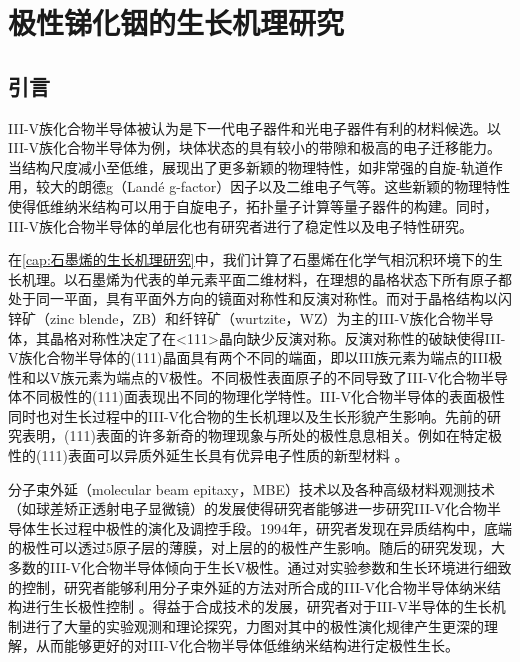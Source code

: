 \chapter{极性锑化铟的生长机理研究}
\section{引言}
    III-V族化合物半导体被认为是下一代电子器件和光电子器件有利的材料候选。以III-V族化合物半导体为例，块体状态的具有较小的带隙和极高的电子迁移能力。当结构尺度减小至低维，展现出了更多新颖的物理特性，如非常强的自旋-轨道作用，较大的朗德g（Landé g-factor）因子以及二维电子气等。这些新颖的物理特性使得低维纳米结构可以用于自旋电子，拓扑量子计算等量子器件的构建。同时，III-V族化合物半导体的单层化也有研究者进行了稳定性以及电子特性研究。

    在\ref{cap:石墨烯的生长机理研究}中，我们计算了石墨烯在化学气相沉积环境下的生长机理。以石墨烯为代表的单元素平面二维材料，在理想的晶格状态下所有原子都处于同一平面，具有平面外方向的镜面对称性和反演对称性。而对于晶格结构以闪锌矿（zinc blende，ZB）和纤锌矿（wurtzite，WZ）为主的III-V族化合物半导体，其晶格对称性决定了在<111>晶向缺少反演对称。反演对称性的破缺使得III-V族化合物半导体的(111)晶面具有两个不同的端面，即以III族元素为端点的III极性和以V族元素为端点的V极性。不同极性表面原子的不同导致了III-V化合物半导体不同极性的(111)面表现出不同的物理化学特性。III-V化合物半导体的表面极性同时也对生长过程中的III-V化合物的生长机理以及生长形貌产生影响。先前的研究表明，(111)表面的许多新奇的物理现象与所处的极性息息相关。例如在特定极性的(111)表面可以异质外延生长具有优异电子性质的新型材料 。

    分子束外延（molecular beam epitaxy，MBE）技术以及各种高级材料观测技术（如球差矫正透射电子显微镜）的发展使得研究者能够进一步研究III-V化合物半导体生长过程中极性的演化及调控手段。1994年，研究者发现在异质结构中，底端的极性可以透过5原子层的薄膜，对上层的的极性产生影响。随后的研究发现，大多数的III-V化合物半导体倾向于生长V极性。通过对实验参数和生长环境进行细致的控制，研究者能够利用分子束外延的方法对所合成的III-V化合物半导体纳米结构进行生长极性控制 。得益于合成技术的发展，研究者对于III-V半导体的生长机制进行了大量的实验观测和理论探究，力图对其中的极性演化规律产生更深的理解，从而能够更好的对III-V化合物半导体低维纳米结构进行定极性生长。

